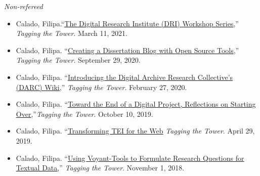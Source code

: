 \documentclass[a4paper,11pt]{article}
\begin{document}
\emph{Non-refereed}
\begin{itemize}
\item Calado, Filipa.``\href{https://gcdi.commons.gc.cuny.edu/2021/03/08/the-digital-research-institute-workshop-series/}{\uline{The
Digital Research Institute (DRI) Workshop Series}},'' \emph{Tagging the
Tower}. March 11, 2021.
\item Calado, Filipa.
``\href{https://digitalfellows.commons.gc.cuny.edu/2020/09/29/creating-a-dissertation-blog-with-open-source-tools/}{\uline{Creating
a Dissertation Blog with Open Source Tools}},'' \emph{Tagging the
Tower}. September 29, 2020.
\item Calado, Filipa.
``\href{https://digitalfellows.commons.gc.cuny.edu/2020/02/27/check-out-the-digital-archive-research-collectives-darc-wiki/}{\uline{Introducing
the Digital Archive Research Collective’s (DARC) Wiki}},'' \emph{Tagging
the Tower}. February 27, 2020.
\item Calado, Filipa.
``\href{https://gcdi.commons.gc.cuny.edu/2019/10/20/toward-the-end-of-a-digital-project-reflections-on-starting-over/}{\uline{Toward
the End of a Digital Project, Reflections on Starting
Over}},''\emph{Tagging the Tower}. October 10, 2019.
\item Calado, Filipa. ``\href{https://gcdi.commons.gc.cuny.edu/2019/04/29/transforming-tei-for-the-web/}{\uline{Transforming TEI for the Web}} \emph{Tagging the
Tower}. April 29, 2019.
\item Calado, Filipa.
``\href{https://gcdi.commons.gc.cuny.edu/2018/11/01/using-voyant-tools-to-formulate-research-questions-for-textual-data/}{\uline{Using
Voyant-Tools to Formulate Research Questions for Textual Data}},''
\emph{Tagging the Tower}. November 1, 2018.
\end{itemize}
\end{document}
